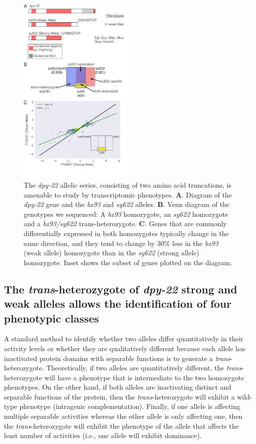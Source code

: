 \documentclass[10pt, onecolumn]{article}
\newcommand{\gene}[1]{\mbox{\emph{#1}}}
\begin{document}
\begin{figure}
  \centering{}
  \includegraphics[width=0.5\textwidth]{../figs/dpy22_allele_comparison.pdf}
  \caption{
    The \gene{dpy-22} allelic series, consisting of two amino acid truncations,
    is amenable to study by transcriptomic phenotypes. \textbf{A}. Diagram of
    the \gene{dpy-22} gene and the \emph{bx93} and \emph{sy622} alleles.
    \textbf{B}. Venn diagram of the genotypes we sequenced: A \emph{bx93}
    homozygote, an \emph{sy622} homozygote and a \emph{bx93/sy622}
    trans-heterozygote. \textbf{C}. Genes that are commonly differentially
    expressed in both homozygotes typically change in the same direction, and
    they tend to change by 30\% less in the \emph{bx93} (weak allele) homozygote
    than in the \emph{sy622} (strong allele) homozygote. Inset shows the subset
    of genes plotted on the diagram.
    }
\label{fig:dpy22}
\end{figure}


\subsection*{The \emph{trans}-heterozygote of \gene{dpy-22} strong and weak
             alleles allows the identification of four phenotypic classes}
A standard method to identify whether two alleles differ quantitatively in their
activity levels or whether they are qualitatively different because each allele
has inactivated protein domains with separable functions is to generate a
\emph{trans}-heterozygote. Theoretically, if two alleles are quantitatively
different, the \emph{trans}-heterozygote will have a phenotype that is
intermediate to the two homozygote phenotypes. On the other hand, if both
alleles are inactivating distinct and separable functions of the protein, then
the \emph{trans}-heterozygote will exhibit a wild-type phenotype (intragenic
complementation). Finally, if one allele is affecting multiple separable
activities whereas the other allele is only affecting one, then the
\emph{trans}-heterozygote will exhibit the phenotype of the allele that affects
the least number of activities (i.e., one allele will exhibit dominance).
\end{document}
